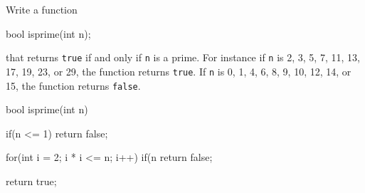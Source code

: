 \nextq
Write a function
\begin{console}
bool isprime(int n);
\end{console}
that returns \verb!true! if and only if \verb!n! is a prime.
For instance if \verb!n! is 2, 3, 5, 7, 11, 13, 17, 19, 23, or 29,
the function returns \verb!true!.
If \verb!n! is 0, 1, 4, 6, 8, 9, 10, 12, 14, or 15,
the function returns \verb!false!.
\\
\ANSWER
\begin{answercode}
bool isprime(int n)
{
  if(n <= 1)
  {
    return false;
  }

  for(int i = 2; i * i <= n; i++)
  {
    if(n %
    {
      return false;
    }
  }

  return true;
}
\end{answercode}


